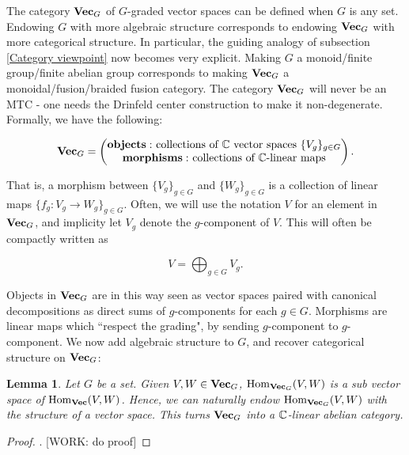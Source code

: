 \documentclass{article}
\newtheorem{lemma}{Lemma}[section]
\theoremstyle{definition}
\numberwithin{figure}{section}
\begin{document}
The category $\bold{Vec}_G$ of $G$-graded vector spaces can be defined when $G$ is any set. Endowing $G$ with more algebraic structure corresponds to endowing $\bold{Vec}_G$ with more categorical structure. In particular, the guiding analogy of subsection \ref{Category viewpoint} now becomes very explicit. Making $G$ a monoid/finite group/finite abelian group corresponds to making $\bold{Vec}_G$ a monoidal/fusion/braided fusion category. The category $\bold{Vec}_G$ will never be an MTC - one needs the Drinfeld center construction to make it non-degenerate. Formally, we have the following:

$$\bold{Vec}_G=
\begin{pmatrix}
\bold{objects: }\text{ collections of $\mathbb{C}$ vector spaces }\{V_g\}_{g\in G}\\
\bold{morphisms: }\text{ collections of $\mathbb{C}$-linear maps}
\end{pmatrix}.$$

That is, a morphism between $\{V_g\}_{g\in G}$ and $\{W_g\}_{g\in G}$ is a collection of linear maps $\{f_g:V_g\to W_g\}_{g\in G}.$ Often, we will use the notation $V$ for an element in $\bold{Vec}_G$, and implicity let $V_g$ denote the $g$-component of $V$. This will often be compactly written as

$$V=\bigoplus_{g\in G}V_g.$$

Objects in $\bold{Vec}_G$ are in this way seen as vector spaces paired with canonical decompositions as direct sums of $g$-components for each $g\in G$. Morphisms are linear maps which ``respect the grading", by sending $g$-component to $g$-component. We now add algebraic structure to $G$, and recover categorical structure on $\bold{Vec}_G$:

\begin{lemma} Let $G$ be a set. Given $V,W\in \bold{Vec}_G$, $\mathrm{Hom}_{\bold{Vec}_G}(V,W)$ is a sub vector space of $\mathrm{Hom}_{\bold{Vec}}(V,W)$. Hence, we can naturally endow $\mathrm{Hom}_{\bold{Vec}_G}(V,W)$ with the structure of a vector space. This turns $\bold{Vec}_G$ into a $\mathbb{C}$-linear abelian category.
\end{lemma}
\begin{proof}. [WORK: do proof]
\end{proof}
\end{document}
